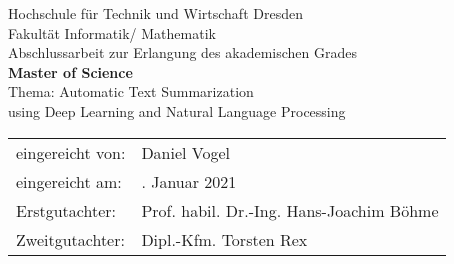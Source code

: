 \begin{titlepage}

\begin{center}
\large{Hochschule für Technik und Wirtschaft Dresden} \\[1ex]
\large{Fakultät Informatik/ Mathematik} \\[18ex]
\Large{Abschlussarbeit zur Erlangung des akademischen Grades} \\[3ex]
\LARGE{\textbf{Master of Science}} \\[12ex]
\Large{Thema: Automatic Text Summarization} \\[1ex]
\Large{using Deep Learning and Natural Language Processing} \\[18ex]
\end{center}

\begin{flushleft}
\begin{tabular}{ll}
eingereicht von: & \quad Daniel Vogel \\[2ex]
eingereicht am: & \quad 1. Januar 2021 \\[2ex]
Erstgutachter:  & \quad Prof. habil. Dr.-Ing. Hans-Joachim Böhme \\[2ex]
Zweitgutachter: & \quad Dipl.-Kfm. Torsten Rex \\[2ex]
\end{tabular}
\end{flushleft}

\end{titlepage}
